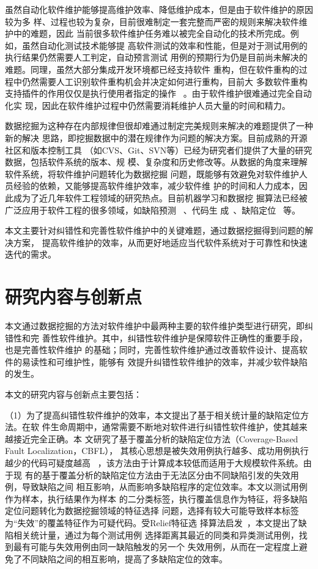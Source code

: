 虽然自动化软件维护能够提高维护效率、降低维护成本，但是由于软件维护的原因较为多
样、过程也较为复杂，目前很难制定一套完整而严密的规则来解决软件维护中的难题，因此
当前很多软件维护任务难以被完全自动化的技术所完成。例如，虽然自动化测试技术能够提
高软件测试的效率和性能，但是对于测试用例的执行结果仍然需要人工判定，自动预言测试
用例的预期行为仍是目前尚未解决的难题。同理，虽然大部分集成开发环境都已经支持软件
重构，但在软件重构的过程中仍然需要人工识别软件重构机会并决定如何进行重构，目前大
多数软件重构支持插件的作用仅仅是执行使用者指定的操作
~\cite{fowler1999refactoring, murphy2012we}。由于软件维护很难通过完全自动化实
现，因此在软件维护过程中仍然需要消耗维护人员大量的时间和精力。

数据挖掘为这种存在内部规律但很却难通过制定完美规则来解决的难题提供了一种新的解决
思路，即挖掘数据中的潜在规律作为问题的解决方案。目前成熟的开源社区和版本控制工具
（如CVS、Git、SVN等）已经为研究者们提供了大量的研究数据，包括软件系统的版本、规
模、复杂度和历史修改等。从数据的角度来理解软件系统，将软件维护问题转化为数据挖掘
问题，既能够有效避免对软件维护人员经验的依赖，又能够提高软件维护效率，减少软件维
护的时间和人力成本，因此成为了近几年软件工程领域的研究热点。目前机器学习和数据挖
掘算法已经被广泛应用于软件工程的很多领域，如缺陷预测
~\cite{menzies2007data,drown2009evolutionary,khoshgoftaar2010attribute}、代码生
成~\cite{maddison2014structured,ling2016latent}、缺陷定位
~\cite{malcov2013,nnfault2013}等。

本文主要针对纠错性和完善性软件维护中的关键难题，通过数据挖掘得到问题的解决方案，
提高软件维护的效率，从而更好地适应当代软件系统对于可靠性和快速迭代的需求。

\section{研究内容与创新点}
本文通过数据挖掘的方法对软件维护中最两种主要的软件维护类型进行研究，即纠错性和完
善性软件维护。其中，纠错性软件维护是保障软件正确性的重要手段，也是完善性软件维护
的基础；同时，完善性软件维护通过改善软件设计、提高软件的易读性和可维护性，能够有
效提升纠错性软件维护的效率，并减少软件缺陷的发生。

本文的研究内容与创新点主要包括：

（1）为了提高纠错性软件维护的效率，本文提出了基于相关统计量的缺陷定位方法。在软
件生命周期中，通常需要不断地对软件进行纠错性软件维护，使其越来越接近完全正确。本
文研究了基于覆盖分析的缺陷定位方法（Coverage-Based Fault Localization，CBFL），
其核心思想是被失效用例执行越多、成功用例执行越少的代码可疑度越高
~\cite{jones2005empirical}，该方法由于计算成本较低而适用于大规模软件系统。由于现
有的基于覆盖分析的缺陷定位方法由于无法区分由不同缺陷引发的失效用例，导致缺陷之间
相互影响，从而影响多缺陷程序的定位效率。本文以测试用例作为样本，执行结果作为样本
的二分类标签，执行覆盖信息作为特征，将多缺陷定位问题转化为数据挖掘领域的特征选择
问题，选择有较大可能导致样本标签为``失效''的覆盖特征作为可疑代码。受Relief特征选
择算法启发~\cite{kira1992feature}，本文提出了缺陷相关统计量，通过为每个测试用例
选择距离其最近的同类和异类测试用例，找到最有可能与失效用例由同一缺陷触发的另一个
失效用例，从而在一定程度上避免了不同缺陷之间的相互影响，提高了多缺陷定位的效率。

